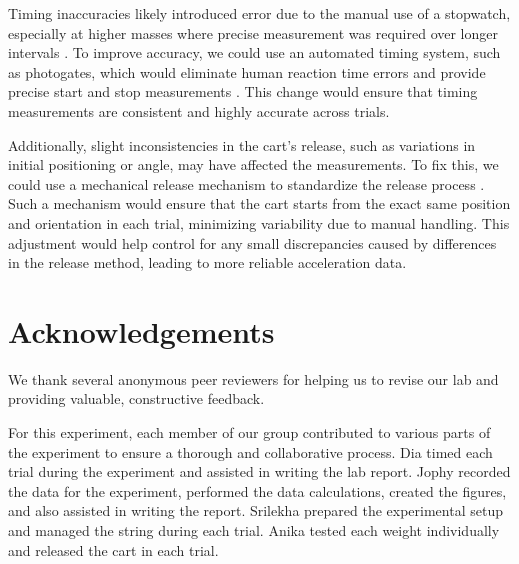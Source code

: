 ﻿\documentclass[reprint,amsmath,amssymb,aps]{revtex4-2}
\begin{document}
Timing inaccuracies likely introduced error due to the manual use of a stopwatch, especially at higher masses where precise measurement was required over longer intervals \cite{hetzler2008reliability}. To improve accuracy, we could use an automated timing system, such as photogates, which would eliminate human reaction time errors and provide precise start and stop measurements \cite{taylor1997introduction}. This change would ensure that timing measurements are consistent and highly accurate across trials. 

Additionally, slight inconsistencies in the cart’s release, such as variations in initial positioning or angle, may have affected the measurements. To fix this, we could use a mechanical release mechanism to standardize the release process \cite{taylor1997introduction}. Such a mechanism would ensure that the cart starts from the exact same position and orientation in each trial, minimizing variability due to manual handling. This adjustment would help control for any small discrepancies caused by differences in the release method, leading to more reliable acceleration data.





\section{Acknowledgements}
We thank several anonymous peer reviewers for helping us to revise our lab and providing valuable, constructive feedback. 

For this experiment, each member of our group contributed to various parts of the experiment to ensure a thorough and collaborative process. Dia timed each trial during the experiment and assisted in writing the lab report. Jophy recorded the data for the experiment, performed the data calculations, created the figures, and also assisted in writing the report. Srilekha prepared the experimental setup and managed the string during each trial. Anika tested each weight individually and released the cart in each trial. 
\end{document}
